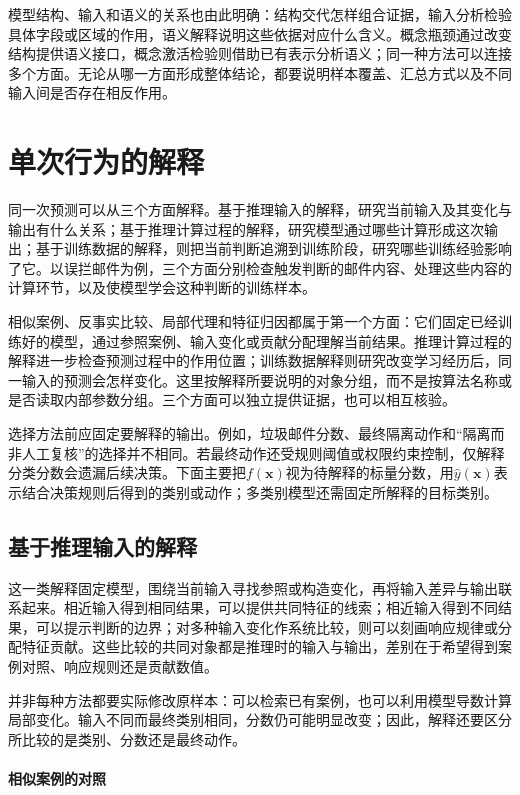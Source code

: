 模型结构、输入和语义的关系也由此明确：结构交代怎样组合证据，输入分析检验具体字段或区域的作用，语义解释说明这些依据对应什么含义。概念瓶颈通过改变结构提供语义接口，概念激活检验则借助已有表示分析语义；同一种方法可以连接多个方面。无论从哪一方面形成整体结论，都要说明样本覆盖、汇总方式以及不同输入间是否存在相反作用。

\section{单次行为的解释}
\label{sec:interpretability-local}

同一次预测可以从三个方面解释。基于推理输入的解释，研究当前输入及其变化与输出有什么关系；基于推理计算过程的解释，研究模型通过哪些计算形成这次输出；基于训练数据的解释，则把当前判断追溯到训练阶段，研究哪些训练经验影响了它。以误拦邮件为例，三个方面分别检查触发判断的邮件内容、处理这些内容的计算环节，以及使模型学会这种判断的训练样本。

相似案例、反事实比较、局部代理和特征归因都属于第一个方面：它们固定已经训练好的模型，通过参照案例、输入变化或贡献分配理解当前结果。推理计算过程的解释进一步检查预测过程中的作用位置；训练数据解释则研究改变学习经历后，同一输入的预测会怎样变化。这里按解释所要说明的对象分组，而不是按算法名称或是否读取内部参数分组。三个方面可以独立提供证据，也可以相互核验。

选择方法前应固定要解释的输出。例如，垃圾邮件分数、最终隔离动作和“隔离而非人工复核”的选择并不相同。若最终动作还受规则阈值或权限约束控制，仅解释分类分数会遗漏后续决策。下面主要把$f(\bm{x})$视为待解释的标量分数，用$\hat y(\bm{x})$表示结合决策规则后得到的类别或动作；多类别模型还需固定所解释的目标类别。

\subsection{基于推理输入的解释}
\label{sec:interpretability-local-input}

这一类解释固定模型，围绕当前输入寻找参照或构造变化，再将输入差异与输出联系起来。相近输入得到相同结果，可以提供共同特征的线索；相近输入得到不同结果，可以提示判断的边界；对多种输入变化作系统比较，则可以刻画响应规律或分配特征贡献。这些比较的共同对象都是推理时的输入与输出，差别在于希望得到案例对照、响应规则还是贡献数值。

并非每种方法都要实际修改原样本：可以检索已有案例，也可以利用模型导数计算局部变化。输入不同而最终类别相同，分数仍可能明显改变；因此，解释还要区分所比较的是类别、分数还是最终动作。

\paragraph{相似案例的对照}
\label{sec:interpretability-local-examples}

